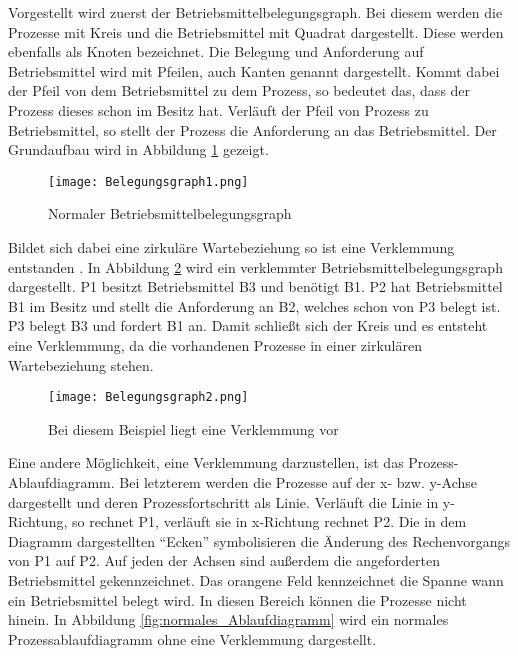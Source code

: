 Vorgestellt wird zuerst der Betriebsmittelbelegungsgraph. Bei diesem werden die Prozesse mit Kreis und die Betriebsmittel mit Quadrat dargestellt. Diese werden ebenfalls als Knoten bezeichnet. Die Belegung und Anforderung auf Betriebsmittel wird mit Pfeilen, auch Kanten genannt dargestellt. Kommt dabei der Pfeil von dem Betriebsmittel zu dem Prozess, so bedeutet das, dass der Prozess dieses schon im Besitz hat. Verläuft der Pfeil von Prozess zu Betriebsmittel, so stellt der Prozess die Anforderung an das Betriebsmittel. Der Grundaufbau wird in Abbildung \ref{fig:normaler_betriebsmittelbelegungsgraph} gezeigt.

\begin{figure}[h]
\caption{Normaler Betriebsmittelbelegungsgraph}
\label{fig:normaler_betriebsmittelbelegungsgraph}
\centering
\texttt{[image: Belegungsgraph1.png]}
\end{figure}

Bildet sich dabei eine zirkuläre Wartebeziehung so ist eine Verklemmung entstanden \parencite[vgl.][S. 197]{baun2017}.  In Abbildung \ref{fig:verklemmter_betriebsmittelbelegungsgraph} wird ein verklemmter Betriebsmittelbelegungsgraph dargestellt.
P1 besitzt Betriebsmittel B3 und benötigt B1. P2 hat Betriebsmittel B1 im Besitz und stellt die Anforderung an B2, welches schon von P3 belegt ist. P3 belegt B3 und fordert B1 an. Damit schließt sich der Kreis und es entsteht eine Verklemmung, da die vorhandenen Prozesse in einer zirkulären Wartebeziehung stehen.

\begin{figure}[H]
\caption{Bei diesem Beispiel liegt eine Verklemmung vor}
\label{fig:verklemmter_betriebsmittelbelegungsgraph}
\centering
\texttt{[image: Belegungsgraph2.png]}
\end{figure}

Eine andere Möglichkeit, eine Verklemmung darzustellen, ist das Prozess-Ablaufdiagramm. Bei letzterem werden die Prozesse auf der x- bzw. y-Achse dargestellt und deren Prozessfortschritt als Linie. Verläuft die Linie in y-Richtung, so rechnet P1, verläuft sie in x-Richtung rechnet P2. Die in dem Diagramm dargestellten ``Ecken'' symbolisieren die Änderung des Rechenvorgangs von P1 auf P2. Auf jeden der Achsen sind außerdem die angeforderten Betriebsmittel gekennzeichnet. Das orangene Feld kennzeichnet die Spanne wann ein Betriebsmittel belegt wird. In diesen Bereich können die Prozesse nicht hinein.
In Abbildung \ref{fig:normales_Ablaufdiagramm} wird ein normales Prozessablaufdiagramm ohne eine Verklemmung dargestellt.

